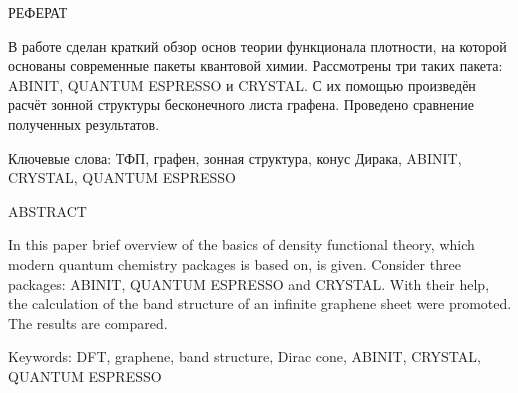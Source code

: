\begin{center}
    РЕФЕРАТ
\end{center}

В работе сделан краткий обзор основ теории функционала плотности, на которой основаны современные пакеты квантовой химии. Рассмотрены три таких пакета: ABINIT, QUANTUM ESPRESSO и CRYSTAL. С их помощью произведён расчёт зонной структуры бесконечного листа графена. Проведено сравнение полученных результатов.

\vspace{1cm}
\noindent Ключевые слова: ТФП, графен, зонная структура, конус Дирака, ABINIT, CRYSTAL, QUANTUM ESPRESSO

\vspace{2cm}
\begin{center}
    ABSTRACT
\end{center}

In this paper brief overview of the basics of density functional theory, which  modern quantum chemistry packages is based on, is given. Consider three packages: ABINIT, QUANTUM ESPRESSO and CRYSTAL. With their help, the calculation of the band structure of an infinite graphene sheet were promoted. The results are compared.

\vspace{1cm}
\noindent Keywords: DFT, graphene, band structure, Dirac cone, ABINIT, CRYSTAL, QUANTUM ESPRESSO